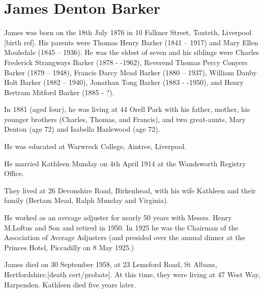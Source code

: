 \section{James Denton Barker}\label{James_Denton_Barker}

James was born on the 18th July 1876 in 10 Falkner Street, Toxteth, Liverpool [birth ref]. His parents were  Thomas Henry Barker (1841 -- 1917) and Mary Ellen Moulsdale (1845 -- 1936). He was the eldest of seven and his siblings were Charles Frederick Strangways Barker (1878 - -1962),  Reverend Thomas Percy Conyers Barker (1879 -- 1948), Francis Darcy Mead Barker (1880 -- 1937), William Danby Holt Barker (1882 -- 1940), Jonathan Tong Barker (1883 - -1950), and Henry Bertram Mitford Barker (1885 - ?).  

In 1881 (aged four), he was living at 44 Orell Park with his father, mother, his younger brothers (Charles, Thomas, and Francis), and two great-aunts, Mary Denton (age 72) and Isabella Hazlewood (age 72).\cite{UKCensusRG11_3688}

He was educated at Warwreck College, Aintree, Liverpool.

He married Kathleen Munday on 4th April 1914 at the Wandsworth Registry Office.

They lived at 26 Devonshire Road, Birkenhead, with his wife Kathleen and their family (Bertam Mead, Ralph Munday and Virginia).

He worked as an average adjuster for nearly 50 years with Messrs. Henry M.Loftus and Son and retired in 1950. In 1925 he was the Chairman of the Association of Average Adjusters (and presided over the annual dinner at the Princes Hotel, Piccadilly on 8 May 1925.)

James died on 30 September 1958, at 23 Lemsford Road, St Albans, Hertfordshire.[death cert/probate]. At this time, they were living at 47 West Way, Harpenden. Kathleen died five years later.




